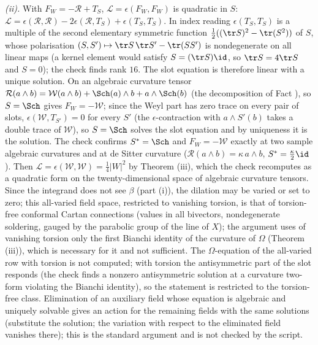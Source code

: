 \emph{(ii).} With $F_{W} = -\mathcal{R} + T_{S}$, $\mathcal{L} = \epsilon(F_{W}, F_{W})$ is quadratic in $S$: $\mathcal{L} = \epsilon(\mathcal{R}, \mathcal{R}) - 2\epsilon(\mathcal{R}, T_{S}) + \epsilon(T_{S}, T_{S})$. In index reading $\epsilon(T_{S}, T_{S})$ is a multiple of the second elementary symmetric function $\tfrac12((\tr S)^{2} - \tr(S^{2}))$ of $S$, whose polarisation $(S, S') \mapsto \tr S\,\tr S' - \tr(SS')$ is nondegenerate on all linear maps (a kernel element would satisfy $S = (\tr S)\id$, so $\tr S = 4\tr S$ and $S = 0$); the check finds rank $16$. The slot equation is therefore linear with a unique solution. On an algebraic curvature tensor $\mathcal{R}(a \wedge b) = \mathcal{W}(a \wedge b) + \Sch(a) \wedge b + a \wedge \Sch(b)$ (the decomposition of Fact ), so $S = \Sch$ gives $F_{W} = -\mathcal{W}$; since the Weyl part has zero trace on every pair of slots, $\epsilon(\mathcal{W}, T_{S'}) = 0$ for every $S'$ (the $\epsilon$-contraction with $a \wedge S'(b)$ takes a double trace of $\mathcal{W}$), so $S = \Sch$ solves the slot equation and by uniqueness it is the solution. The check confirms $S^{*} = \Sch$ and $F_{W} = -\mathcal{W}$ exactly at two sample algebraic curvatures and at de Sitter curvature ($\mathcal{R}(a \wedge b) = \kappa\, a \wedge b$, $S^{*} = \tfrac{\kappa}{2}\id$). Then $\mathcal{L} = \epsilon(\mathcal{W}, \mathcal{W}) = \tfrac14|W|^{2}$ by Theorem (iii), which the check recomputes as a quadratic form on the twenty-dimensional space of algebraic curvature tensors. Since the integrand does not see $\beta$ (part (i)), the dilation may be varied or set to zero; this all-varied field space, restricted to vanishing torsion, is that of torsion-free conformal Cartan connections (values in all bivectors, nondegenerate soldering, gauged by the parabolic group of the line of $X$); the argument uses of vanishing torsion only the first Bianchi identity of the curvature of $\Omega$ (Theorem (iii)), which is necessary for it and not sufficient. The $\Omega$-equation of the all-varied row with torsion is not computed; with torsion the antisymmetric part of the slot responds (the check finds a nonzero antisymmetric solution at a curvature two-form violating the Bianchi identity), so the statement is restricted to the torsion-free class. Elimination of an auxiliary field whose equation is algebraic and uniquely solvable gives an action for the remaining fields with the same solutions (substitute the solution; the variation with respect to the eliminated field vanishes there); this is the standard argument and is not checked by the script.

